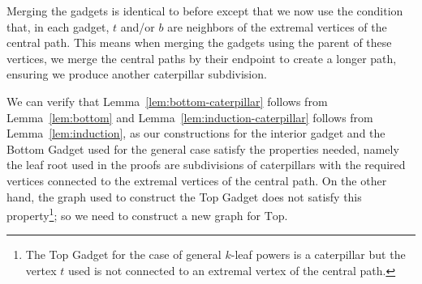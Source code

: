 \documentclass[11pt,letter]{article}
\theoremstyle{remark}
\newcommand{\T}{\text{Top}}
\begin{document}
Merging the gadgets is identical to before except that we now use the condition that, in each gadget, $t$ and/or $b$ are neighbors of the extremal vertices of the central path. This means when merging the gadgets using the parent of these vertices, we merge the central paths by their endpoint to create a longer path, ensuring we produce another caterpillar subdivision.

We can verify that Lemma~\ref{lem:bottom-caterpillar} follows from Lemma~\ref{lem:bottom} and Lemma~\ref{lem:induction-caterpillar} follows from Lemma~\ref{lem:induction}, as our constructions for the interior gadget and the Bottom Gadget used for the general case satisfy the properties needed, namely the leaf root used in the proofs are subdivisions of caterpillars with the required vertices connected to the extremal vertices of the central path. On the other hand, the graph used to construct the Top Gadget does not satisfy this property\footnote{The Top Gadget for the case of general $k$-leaf powers is a caterpillar but the vertex $t$ used is not connected to an extremal vertex of the central path.}; so we need to construct a new graph for $\T$.
\end{document}
